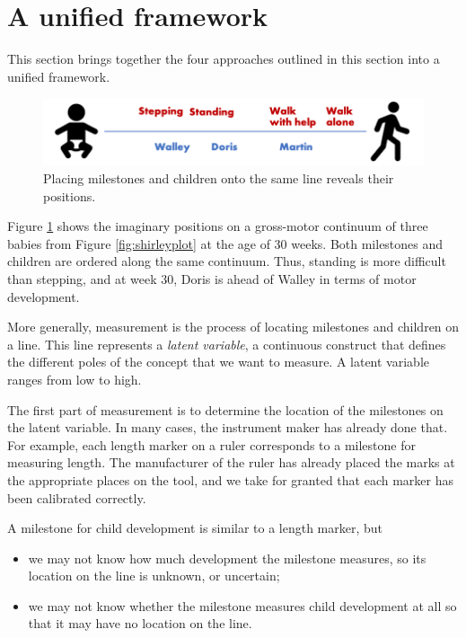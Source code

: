 \documentclass[
]{book}
\begin{document}
\hypertarget{sec:whatismeasurement}{%
\section{A unified framework}\label{sec:whatismeasurement}}

This section brings together the four approaches outlined in this section into a unified framework.

\begin{figure}

{\centering \includegraphics[width=1\linewidth]{fig/lineplot} 

}

\caption{Placing milestones and children onto the same line reveals their positions.}\label{fig:lineplot}
\end{figure}



Figure \ref{fig:lineplot} shows the imaginary positions on a gross-motor continuum of three babies from Figure \ref{fig:shirleyplot} at the age of 30 weeks. Both milestones and children are ordered along the same continuum. Thus, standing is more difficult than stepping, and at week 30, Doris is ahead of Walley in terms of motor development.

More generally, measurement is the process of locating milestones and children on a line. This line represents a \emph{latent variable}, a continuous construct that defines the different poles of the concept that we want to measure. A latent variable ranges from low to high.

The first part of measurement is to determine the location of the milestones on the latent variable. In many cases, the instrument maker has already done that. For example, each length marker on a ruler corresponds to a milestone for measuring length. The manufacturer of the ruler has already placed the marks at the appropriate places on the tool, and we take for granted that each marker has been calibrated correctly.

A milestone for child development is similar to a length marker, but

\begin{itemize}
\item
  we may not know how much development the milestone measures, so its location on the line is unknown, or uncertain;
\item
  we may not know whether the milestone measures child development at all so that it may have no location on the line.
\end{itemize}
\end{document}

